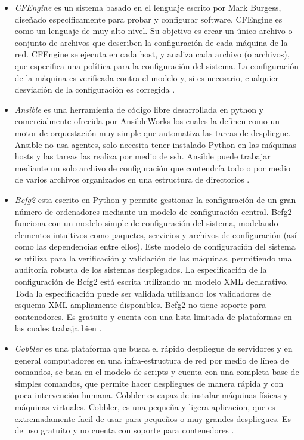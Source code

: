\documentclass[conference, spanish]{IEEEtran}
\begin{document}
\begin{itemize}
\item \emph{CFEngine} es un sistema basado en el lenguaje escrito por Mark Burgess, diseñado específicamente para probar y configurar software. CFEngine es como un lenguaje de muy alto nivel. Su objetivo es crear un único archivo o conjunto de archivos que describen la configuración de cada máquina de la red. CFEngine se ejecuta en cada host, y analiza cada archivo (o archivos), que especifica una política para la configuración del sistema. La configuración de la máquina es verificada contra el modelo y, si es necesario, cualquier desviación de la configuración es corregida \cite{cfengine15}.

\item \emph{Ansible} es una herramienta de código libre desarrollada en python y comercialmente ofrecida por AnsibleWorks los cuales la definen como un motor de orquestación muy simple que automatiza las tareas de despliegue. Ansible no usa agentes, solo necesita tener instalado Python en las máquinas hosts y las tareas las realiza por medio de ssh. Ansible puede trabajar mediante un solo archivo de configuración que contendría todo o por medio de varios archivos organizados en una estructura de directorios \cite{ans16}.

\item \emph{Bcfg2} esta escrito en Python y permite gestionar la configuración de un gran número de ordenadores mediante un modelo de configuración central. Bcfg2 funciona con un modelo simple de configuración del sistema, modelando elementos intuitivos como paquetes, servicios y archivos de configuración (así como las dependencias entre ellos). Este modelo de configuración del sistema se utiliza para la verificación  y validación de las máquinas, permitiendo una auditoría robusta de los sistemas desplegados. La especificación de la configuración de Bcfg2 está escrita utilizando un modelo XML declarativo. Toda la especificación puede ser validada utilizando los validadores de esquema XML ampliamente disponibles. Bcfg2 no tiene soporte para contenedores. Es gratuito y cuenta con una lista limitada de plataformas en las cuales trabaja bien \cite{bdfg215}.

\item \emph{Cobbler} es una plataforma que busca el rápido despliegue de servidores y en general computadores en una infra-estructura de red por medio de línea de comandos, se basa en el modelo de scripts y cuenta con una completa base de simples comandos, que permite hacer despliegues de manera rápida y con poca intervención humana. Cobbler es capaz de instalar máquinas físicas y máquinas virtuales. Cobbler, es una pequeña y ligera aplicacion, que es extremadamente facil de usar para pequeños o muy grandes despliegues. Es de uso gratuito y no cuenta con soporte para contenedores \cite{Cobbler15}.


\end{itemize}
\end{document}
